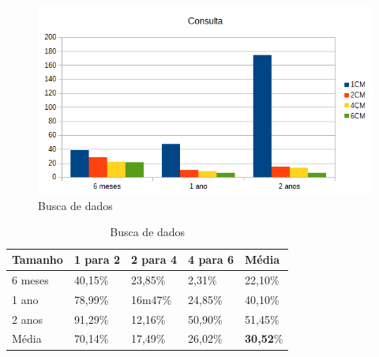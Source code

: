 \begin{figure}[!htb]
	\centering
	\includegraphics[width=1\textwidth]{figuras/graph_select_buscas.png}
	\caption{Busca de dados}
	\label{fig:graph_select_busca}
\end{figure}

\begin{table}[]
	\centering
	\caption{Busca de dados}
	\label{tab:melhora_select}
	\begin{tabular}{lllll}
		\textbf{Tamanho} & \textbf{1 para 2} & \textbf{2 para 4} & \textbf{4 para 6} & \textbf{Média} \\ \hline
		6 meses          & 40,15\%		 	 & 23,85\%        	 & 2,31\%         	 & 22,10\%        \\ \hline
		1 ano            & 78,99\% 		 	 & 16m47\%       	 & 24,85\%        	 & 40,10\%         \\ \hline
		2 anos           & 91,29\%		 	 & 12,16\%        	 & 50,90\%        	 & 51,45\%         \\ \hline
        Média 		     & 70,14\%		 	 & 17,49\%        	 & 26,02\%        	 & \textbf{30,52}\%         \\ \hline
	\end{tabular}
\end{table}